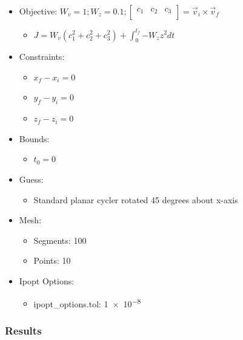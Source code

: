 \documentclass{article}
\begin{document}
\begin{itemize}
    \item Objective: $W_v = 1; W_z = 0.1; \left[\begin{matrix}c_1&c_2&c_3\\\end{matrix}\right] = \vec{v}_i\times\vec{v}_f$
    \begin{itemize}
        \item $J = W_v\left(c_1^2 + c_2^2 + c_3^2\right) + \int_{0}^{t_f}{-W_zz^2dt}$
    \end{itemize}
    \item Constraints:
    \begin{itemize}
        \item $x_f - x_i = 0$
        \item $y_f - y_i = 0$
        \item $z_f - z_i = 0$
    \end{itemize}
    \item Bounds:
    \begin{itemize}
        \item $t_0 = 0$
    \end{itemize}
    \item Guess:
    \begin{itemize}
        \item Standard planar cycler rotated 45 degrees about x-axis
    \end{itemize}
    \item Mesh:
    \begin{itemize}
        \item Segments: 100
        \item Points: 10
    \end{itemize}
    \item Ipopt Options:
    \begin{itemize}
        \item ipopt\_options.tol: \num{1e-8}
    \end{itemize}
\end{itemize}

\subsubsection{Results}
\end{document}
